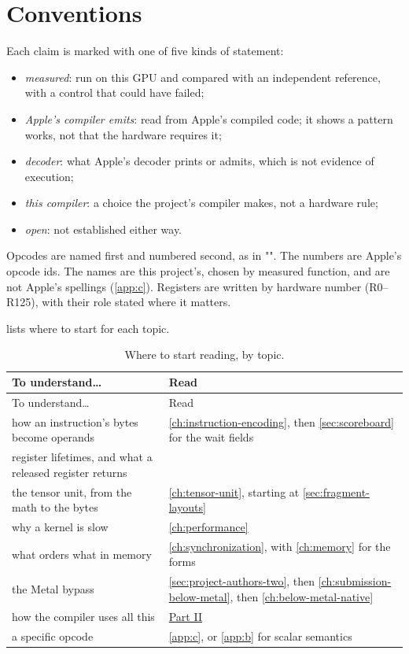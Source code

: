\section{Conventions}\label{sec:read-this-document}

Each claim is marked with one of five kinds of statement:

\begin{itemize}
\item \emph{measured}: run on this GPU and compared with an independent reference, with a control that could have failed;
\item \emph{Apple's compiler emits}: read from Apple's compiled code; it shows a pattern works, not that the hardware
  requires it;
\item \emph{decoder}: what Apple's decoder prints or admits, which is not evidence of execution;
\item \emph{this compiler}: a choice the project's compiler makes, not a hardware rule;
\item \emph{open}: not established either way.
\end{itemize}

Opcodes are named first and numbered second, as in "". The numbers are
Apple's opcode ids. The names are this project's, chosen by measured function, and are not Apple's spellings
(\cref{app:c}). Registers are written by hardware number (R0–R125), with their role stated where it matters.

 lists where to start for each topic.

\begin{xltabular}{\linewidth}{@{}>{\hsize}X>{\hsize}X@{}}
\caption{Where to start reading, by topic.}\label{tab:reading-guide}\\
\toprule
To understand\dots{} & Read \\
\midrule
\endfirsthead
{}
\toprule
To understand\dots{} & Read \\
\midrule
\endhead
how an instruction's bytes become operands & \cref{ch:instruction-encoding}, then \cref{sec:scoreboard}
for the wait fields \\*
register lifetimes, and what a released register returns &  \\*
the tensor unit, from the math to the bytes & \cref{ch:tensor-unit}, starting at \cref{sec:fragment-layouts} \\*
why a kernel is slow & \cref{ch:performance} \\*
what orders what in memory & \cref{ch:synchronization}, with \cref{ch:memory} for the
forms \\*
the Metal bypass & \cref{sec:project-authors-two}, then 
\cref{ch:submission-below-metal}, then
\cref{ch:below-metal-native} \\*
how the compiler uses all this & \hyperref[part:ii]{Part II} \\*
a specific opcode & \cref{app:c}, or \cref{app:b} for scalar semantics \\*
\bottomrule
\end{xltabular}

